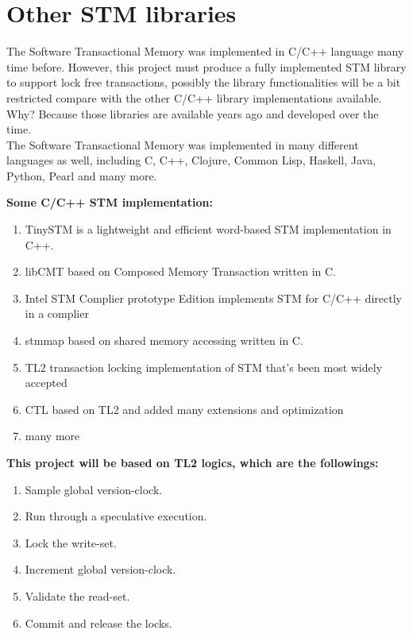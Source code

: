 \documentclass[12pt]{article}
\begin{document}
\newpage
\section{Other STM libraries}
The Software Transactional Memory was implemented in C/C++ language many time before. However, this project must produce a fully implemented STM library to support lock free transactions, possibly the library functionalities will be a bit restricted compare with the other C/C++ library implementations available. Why? Because those libraries are available years ago and developed over the time.\\

The Software Transactional Memory was implemented in many different languages as well, including C, C++, Clojure, Common Lisp, Haskell, Java, Python, Pearl and many more.

\textbf{Some C/C++ STM implementation:} 
\begin{enumerate}
\item TinySTM is a lightweight and efficient word-based STM implementation in C++.
\item libCMT based on Composed Memory Transaction written in C.
\item Intel STM Complier prototype Edition implements STM for C/C++ directly in a complier
\item stmmap based on shared memory accessing written in C.
\item TL2 transaction locking implementation of STM that’s been most widely accepted
\item CTL based on TL2 and added many extensions and optimization
\item many more
\end{enumerate}

\textbf{This project will be based on TL2 logics, which are the followings:}
\begin{enumerate}
\item Sample global version-clock.
\item Run through a speculative execution.
\item Lock the write-set.
\item Increment global version-clock.
\item Validate the read-set.
\item Commit and release the locks.
\end{enumerate}
\end{document}
